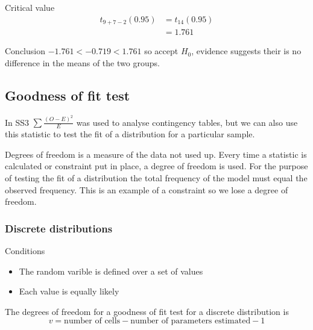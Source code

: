 \begin{example}
            \begin{step}{Critical value}
            \begin{align*}
            t_{9 + 7 - 2}(0.95) &= t_{14}(0.95)\\ 
                                &= 1.761 
            \end{align*}
            \end{step}

            \begin{step}{Conclusion}
            $-1.761 < -0.719 < 1.761$ so accept $H_0$, evidence suggests their is no difference in the means of the two groups.
            \end{step}

            \end{example}

    \newpage
    \subsection{Goodness of fit test}
        In SS3 $\displaystyle\sum{\frac{(O - E)^2}{E}}$ was used to analyse contingency tables, but we can also use this statistic to test the fit of a distribution for a particular sample.

        Degrees of freedom is a measure of the data not used up. Every time a statistic is calculated or constraint put in place, a degree of freedom is used. For the purpose of testing the fit of a distribution the total frequency of the model must equal the observed frequency. This is an example of a constraint so we lose a degree of freedom.

        \subsubsection{Discrete distributions}
            Conditions
            \begin{itemize}
                \item The random varible is defined over a set of values
                \item Each value is equally likely
            \end{itemize}
            The degrees of freedom for a goodness of fit test for a discrete distribution is
            $$v = \text{number of cells} - \text{number of parameters estimated} - 1$$ 

